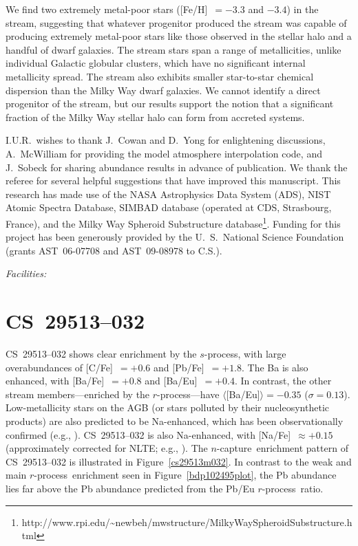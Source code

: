 \documentclass{emulateapj}
\def\rpro{\mbox{$r$-process}}
\def\spro{\mbox{$s$-process}}
\def\ncap{\mbox{$n$-capture}}
\begin{document}
We find two extremely metal-poor stars ([Fe/H]~$= -3.3$ and $-3.4$)
in the stream, suggesting that
whatever progenitor produced the stream was capable of producing
extremely metal-poor stars like those observed in the stellar halo
and a handful of dwarf galaxies.
The stream stars span a range of metallicities,
unlike individual Galactic globular clusters, 
which have no significant internal metallicity spread.
The stream also exhibits smaller star-to-star chemical dispersion 
than the Milky Way dwarf galaxies.
We cannot identify a direct progenitor of the stream, but
our results support the notion that a significant fraction of the
Milky Way stellar halo can form from accreted systems.



\acknowledgments

I.U.R.\ wishes to thank J.\ Cowan and D.\ Yong for enlightening
discussions, A.\ McWilliam for providing the model atmosphere
interpolation code, and J.\ Sobeck for sharing abundance results
in advance of publication.
We thank the referee for several helpful suggestions 
that have improved this manuscript.
This research has made use of the 
NASA Astrophysics Data System (ADS),
NIST Atomic Spectra Database, 
SIMBAD database (operated at CDS, Strasbourg, France),
and the Milky Way Spheroid Substructure database\footnote{
http://www.rpi.edu/\~{}newbeh/mwstructure/MilkyWaySpheroidSubstructure.html}.
Funding for this project has been generously provided by 
the U.~S.\ National Science Foundation
(grants AST~06-07708 and AST~09-08978 to C.S.).

%
{\it Facilities:} 


\appendix


\section{CS~29513--032}
\label{cs29513m032text}


\mbox{CS~29513--032} shows clear enrichment by the \spro, with
large overabundances of [C/Fe]~$= +0.6$ and [Pb/Fe]~$= +1.8$.
The Ba is also enhanced, with [Ba/Fe]~$= +0.8$ and [Ba/Eu]~$= +0.4$.
In contrast, the other stream members---enriched by the \rpro---have 
$\langle$[Ba/Eu]$\rangle = -0.35$ ($\sigma = 0.13$).
Low-metallicity stars on the AGB (or stars polluted by their 
nucleosynthetic products)
are also predicted to be Na-enhanced, 
which has been observationally confirmed 
(e.g., \citealt{ivans05,roederer08}).
\mbox{CS~29513--032} is also Na-enhanced, with
[Na/Fe]~$\approx +0.15$ 
(approximately corrected for NLTE; e.g., \citealt{andrievsky07}).
The \ncap\ enrichment pattern of \mbox{CS~29513--032} is illustrated 
in Figure~\ref{cs29513m032}.
In contrast to the weak and main \rpro\ enrichment seen in 
Figure~\ref{bdp102495plot}, the Pb abundance lies far above
the Pb abundance predicted from the Pb/Eu \rpro\ ratio.
\end{document}
